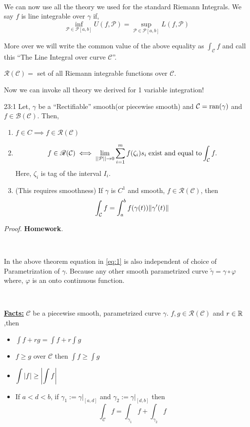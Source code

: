 \documentclass[../Analysis-3.tex]{subfiles}
\begin{document}
\

We can now use all the theory we used for the standard Riemann Integrals. We say $f$ is line integrable over $\gamma$ if,
\[\inf_{\mathcal{P} \in \mathscr{P}[a,b]} U(f,\mathcal{P}) = \sup_{\mathcal{P} \in \mathscr{P}[a,b]} L(f,\mathcal{P})\]

More over we will write the common value of the above equality as $\displaystyle\int_{\mathcal{C}} f$ and call this ``The Line Integral over curve $\mathcal{C}$''.

\begin{notnBox}
  $\mathscr{R}(\mathcal{C}) = $ set of all Riemann integrable functions over $\mathcal{C}$.
\end{notnBox}

Now we can invoke all theory we derived for 1 variable integration!

\begin{Thm}{}{23:1}
  Let, $\gamma$ be a ``Rectifiable'' smooth(or piecewise smooth) and $\mathcal{C} = \operatorname{ran}(\gamma)$ and $f \in \mathscr{B}(\mathcal{C})$. Then,
  \begin{enumerate}
    \item $f \in C \implies f \in \mathscr{R}(\mathcal{C})$
    \item \[ f \in \mathscr{R}(\mathcal{C}) \iff \lim_{||\mathcal{P}||\to 0} \sum_{i=1}^{m} f(\zeta_i)s_i \hspace{0.1cm} \text{exist and equal to}\int_{\mathcal{C}} f.\] Here, $\zeta_i$ is tag of the interval $I_i$.

    \item (This requires smoothness) If $\gamma$ is $C^1$ and smooth, $f \in \mathscr{R}(\mathcal{C})$, then
          \[\int_{\mathcal{C}} f = \int_a^b f(\gamma(t))\norm{\gamma'(t)} \label{eq:1}\]

  \end{enumerate}
\end{Thm}

\textit{Proof.} \textbf{Homework}.

\

In the above theorem equation in \ref{eq:1} is also independent of choice of Parametrization of $\gamma$. Because any other smooth parametrized curve $\tilde{\gamma} = \gamma \circ \varphi$ where, $\varphi$ is an onto continuous function.

\

\textbf{\underline{Facts:}} $\mathcal{C}$ be a piecewise smooth, parametrized curve $\gamma$. $f,g \in \mathscr{R}(\mathcal{C})$ and $r \in \mathbb{R}$,then
\begin{itemize}
  \item $\displaystyle\int f+rg = \displaystyle\int f + r\displaystyle\int g $
  \item $f \ge g$ over $\mathcal{C}$ then $\displaystyle\int f \ge \displaystyle\int g$
  \item $\displaystyle\int \abs{f} \ge \abs{\displaystyle\int f}$
  \item If $a<d<b$, if $\gamma_1 := \gamma |_{[a,d]}$ and $\gamma_2 := \gamma |_{[d,b]}$ then
        \[\int_{\mathcal{C}} f = \int_{\gamma_1}f + \int_{\gamma_2} f \]
\end{itemize}
\end{document}
